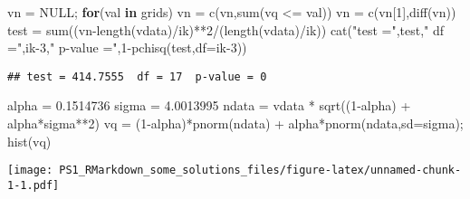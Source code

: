 \documentclass[
]{article}
\newenvironment{Shaded}{\begin{snugshade}}{\end{snugshade}}
\newcommand{\AttributeTok}[1]{\textcolor[rgb]{0.77,0.63,0.00}{#1}}
\newcommand{\ConstantTok}[1]{\textcolor[rgb]{0.00,0.00,0.00}{#1}}
\newcommand{\ControlFlowTok}[1]{\textcolor[rgb]{0.13,0.29,0.53}{\textbf{#1}}}
\newcommand{\DecValTok}[1]{\textcolor[rgb]{0.00,0.00,0.81}{#1}}
\newcommand{\FloatTok}[1]{\textcolor[rgb]{0.00,0.00,0.81}{#1}}
\newcommand{\FunctionTok}[1]{\textcolor[rgb]{0.00,0.00,0.00}{#1}}
\newcommand{\NormalTok}[1]{#1}
\newcommand{\OtherTok}[1]{\textcolor[rgb]{0.56,0.35,0.01}{#1}}
\newcommand{\SpecialCharTok}[1]{\textcolor[rgb]{0.00,0.00,0.00}{#1}}
\newcommand{\StringTok}[1]{\textcolor[rgb]{0.31,0.60,0.02}{#1}}
\begin{document}
\begin{Shaded}
\begin{Highlighting}[]
\NormalTok{vn }\OtherTok{=} \ConstantTok{NULL}\NormalTok{; }\ControlFlowTok{for}\NormalTok{(val }\ControlFlowTok{in}\NormalTok{ grids) vn }\OtherTok{=} \FunctionTok{c}\NormalTok{(vn,}\FunctionTok{sum}\NormalTok{(vq }\SpecialCharTok{\textless{}=}\NormalTok{ val))}
\NormalTok{vn }\OtherTok{=} \FunctionTok{c}\NormalTok{(vn[}\DecValTok{1}\NormalTok{],}\FunctionTok{diff}\NormalTok{(vn))}
\NormalTok{test }\OtherTok{=} \FunctionTok{sum}\NormalTok{((vn}\SpecialCharTok{{-}}\FunctionTok{length}\NormalTok{(vdata)}\SpecialCharTok{/}\NormalTok{ik)}\SpecialCharTok{**}\DecValTok{2}\SpecialCharTok{/}\NormalTok{(}\FunctionTok{length}\NormalTok{(vdata)}\SpecialCharTok{/}\NormalTok{ik))}
\FunctionTok{cat}\NormalTok{(}\StringTok{"test ="}\NormalTok{,test,}\StringTok{" df ="}\NormalTok{,ik}\DecValTok{{-}3}\NormalTok{,}\StringTok{" p{-}value ="}\NormalTok{,}\DecValTok{1}\SpecialCharTok{{-}}\FunctionTok{pchisq}\NormalTok{(test,}\AttributeTok{df=}\NormalTok{ik}\DecValTok{{-}3}\NormalTok{))}
\end{Highlighting}
\end{Shaded}

\begin{verbatim}
## test = 414.7555  df = 17  p-value = 0
\end{verbatim}

\begin{Shaded}
\begin{Highlighting}[]
\NormalTok{alpha }\OtherTok{=} \FloatTok{0.1514736}
\NormalTok{sigma }\OtherTok{=} \FloatTok{4.0013995}
\NormalTok{ndata }\OtherTok{=}\NormalTok{ vdata }\SpecialCharTok{*} \FunctionTok{sqrt}\NormalTok{((}\DecValTok{1}\SpecialCharTok{{-}}\NormalTok{alpha) }\SpecialCharTok{+}\NormalTok{ alpha}\SpecialCharTok{*}\NormalTok{sigma}\SpecialCharTok{**}\DecValTok{2}\NormalTok{)}
\NormalTok{vq }\OtherTok{=}\NormalTok{ (}\DecValTok{1}\SpecialCharTok{{-}}\NormalTok{alpha)}\SpecialCharTok{*}\FunctionTok{pnorm}\NormalTok{(ndata) }\SpecialCharTok{+}\NormalTok{ alpha}\SpecialCharTok{*}\FunctionTok{pnorm}\NormalTok{(ndata,}\AttributeTok{sd=}\NormalTok{sigma); }\FunctionTok{hist}\NormalTok{(vq)}
\end{Highlighting}
\end{Shaded}

\texttt{[image: PS1\_RMarkdown\_some\_solutions\_files/figure-latex/unnamed-chunk-1-1.pdf]}
\end{document}
